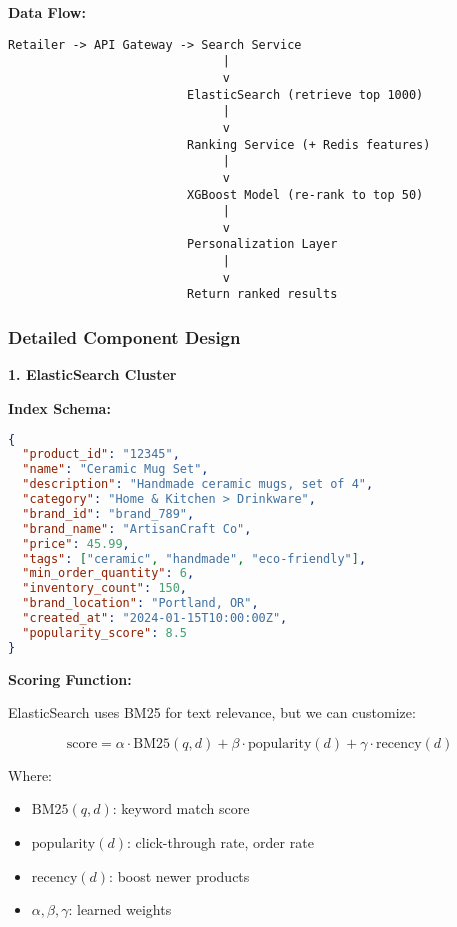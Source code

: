 \documentclass[11pt,letterpaper]{article}
\begin{document}
\textbf{Data Flow:}

\begin{verbatim}
Retailer -> API Gateway -> Search Service
                              |
                              v
                         ElasticSearch (retrieve top 1000)
                              |
                              v
                         Ranking Service (+ Redis features)
                              |
                              v
                         XGBoost Model (re-rank to top 50)
                              |
                              v
                         Personalization Layer
                              |
                              v
                         Return ranked results
\end{verbatim}

\subsubsection{Detailed Component Design}

\textbf{1. ElasticSearch Cluster}

\textbf{Index Schema:}
\begin{lstlisting}[language=json]
{
  "product_id": "12345",
  "name": "Ceramic Mug Set",
  "description": "Handmade ceramic mugs, set of 4",
  "category": "Home & Kitchen > Drinkware",
  "brand_id": "brand_789",
  "brand_name": "ArtisanCraft Co",
  "price": 45.99,
  "tags": ["ceramic", "handmade", "eco-friendly"],
  "min_order_quantity": 6,
  "inventory_count": 150,
  "brand_location": "Portland, OR",
  "created_at": "2024-01-15T10:00:00Z",
  "popularity_score": 8.5
}
\end{lstlisting}

\textbf{Scoring Function:}

ElasticSearch uses BM25 for text relevance, but we can customize:

\begin{equation}
\text{score} = \alpha \cdot \text{BM25}(q, d) + \beta \cdot \text{popularity}(d) + \gamma \cdot \text{recency}(d)
\end{equation}

Where:
\begin{itemize}
    \item $\text{BM25}(q, d)$: keyword match score
    \item $\text{popularity}(d)$: click-through rate, order rate
    \item $\text{recency}(d)$: boost newer products
    \item $\alpha, \beta, \gamma$: learned weights
\end{itemize}
\end{document}
